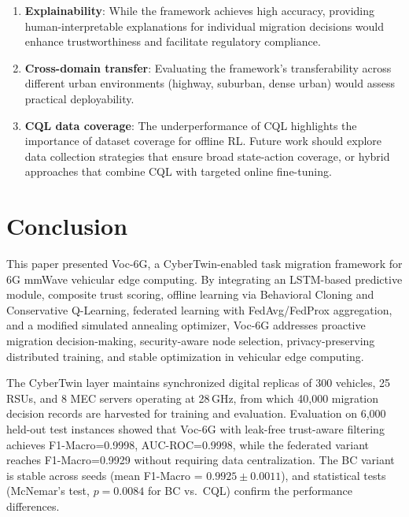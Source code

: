 \documentclass[10pt,letterpaper]{article}
\providecommand{\VocSixG}{Voc-6G}
\begin{document}
\begin{enumerate}
    \item \textbf{Explainability}: While the framework achieves high accuracy, providing human-interpretable explanations for individual migration decisions would enhance trustworthiness and facilitate regulatory compliance.

    \item \textbf{Cross-domain transfer}: Evaluating the framework's transferability across different urban environments (highway, suburban, dense urban) would assess practical deployability.

    \item \textbf{CQL data coverage}: The underperformance of CQL highlights the importance of dataset coverage for offline RL. Future work should explore data collection strategies that ensure broad state-action coverage, or hybrid approaches that combine CQL with targeted online fine-tuning.
\end{enumerate}


\section*{Conclusion}
\label{sec:conclusion}

This paper presented \VocSixG{}, a CyberTwin-enabled task migration framework for 6G mmWave vehicular edge computing. By integrating an LSTM-based predictive module, composite trust scoring, offline learning via Behavioral Cloning and Conservative Q-Learning, federated learning with FedAvg/FedProx aggregation, and a modified simulated annealing optimizer, \VocSixG{} addresses proactive migration decision-making, security-aware node selection, privacy-preserving distributed training, and stable optimization in vehicular edge computing.

The CyberTwin layer maintains synchronized digital replicas of 300 vehicles, 25 RSUs, and 8 MEC servers operating at 28\,GHz, from which 40,000 migration decision records are harvested for training and evaluation. Evaluation on 6,000 held-out test instances showed that \VocSixG{} with leak-free trust-aware filtering achieves F1-Macro=0.9998, AUC-ROC=0.9998, while the federated variant reaches F1-Macro=0.9929 without requiring data centralization. The BC variant is stable across seeds (mean F1-Macro = $0.9925 \pm 0.0011$), and statistical tests (McNemar's test, $p=0.0084$ for BC vs.\ CQL) confirm the performance differences.
\end{document}
